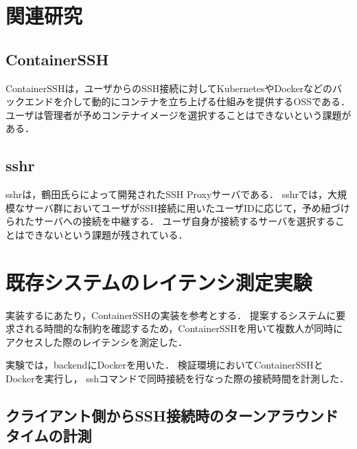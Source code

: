 \documentclass[dvipdfmx]{cs-handout}
\begin{document}
\section{関連研究}

\subsection{ContainerSSH}

ContainerSSHは，ユーザからのSSH接続に対してKubernetesやDockerなどのバックエンドを介して動的にコンテナを立ち上げる仕組みを提供するOSSである\cite{ContainerSSH}．
ユーザは管理者が予めコンテナイメージを選択することはできないという課題がある．

\subsection{sshr}

sshrは，鶴田氏らによって開発されたSSH Proxyサーバである\cite{Tsuruta2020}．
sshrでは，大規模なサーバ群においてユーザがSSH接続に用いたユーザIDに応じて，予め紐づけられたサーバへの接続を中継する．
ユーザ自身が接続するサーバを選択することはできないという課題が残されている．

\section{既存システムのレイテンシ測定実験}

実装するにあたり，ContainerSSHの実装を参考とする．
提案するシステムに要求される時間的な制約を確認するため，ContainerSSHを用いて複数人が同時にアクセスした際のレイテンシを測定した．

実験では，backendにDockerを用いた．
検証環境においてContainerSSHとDockerを実行し， sshコマンドで同時接続を行なった際の接続時間を計測した．

\subsection{クライアント側からSSH接続時のターンアラウンドタイムの計測}
\end{document}
